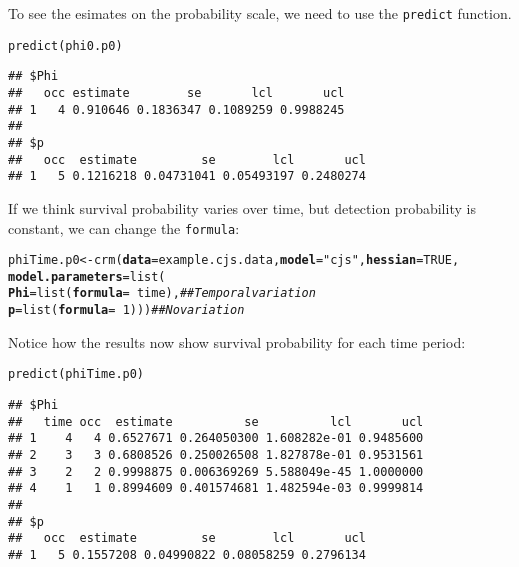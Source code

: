 \documentclass[12pt]{article}\usepackage[]{graphicx}\usepackage[]{color}
\makeatletter
\newcommand{\hlnum}[1]{\textcolor[rgb]{0.69,0.494,0}{#1}}%
\newcommand{\hlstr}[1]{\textcolor[rgb]{0.749,0.012,0.012}{#1}}%
\newcommand{\hlcom}[1]{\textcolor[rgb]{0.514,0.506,0.514}{\textit{#1}}}%
\newcommand{\hlopt}[1]{\textcolor[rgb]{0,0,0}{#1}}%
\newcommand{\hlstd}[1]{\textcolor[rgb]{0,0,0}{#1}}%
\newcommand{\hlkwb}[1]{\textcolor[rgb]{0,0.341,0.682}{#1}}%
\newcommand{\hlkwc}[1]{\textcolor[rgb]{0,0,0}{\textbf{#1}}}%
\newcommand{\hlkwd}[1]{\textcolor[rgb]{0.004,0.004,0.506}{#1}}%
\newenvironment{kframe}{%
 \def\at@end@of@kframe{}%
 \ifinner\ifhmode%
  \def\at@end@of@kframe{\end{minipage}}%
  \begin{minipage}{\columnwidth}%
 \fi\fi%
 \def\FrameCommand##1{\hskip\@totalleftmargin \hskip-\fboxsep
 \colorbox{shadecolor}{##1}\hskip-\fboxsep
     \hskip-\linewidth \hskip-\@totalleftmargin \hskip\columnwidth}%
 \MakeFramed {\advance\hsize-\width
   \@totalleftmargin\z@ \linewidth\hsize
   \@setminipage}}%
 {\par\unskip\endMakeFramed%
 \at@end@of@kframe}
\newenvironment{knitrout}{}{} %
\newcommand{\inr}[1]{\colorbox{inlinecolor}{\texttt{#1}}}
\makeatother
\begin{document}
To see the esimates on the probability scale, we need to use the
\inr{predict} function.

\begin{knitrout}
\color{fgcolor}\begin{kframe}
\begin{alltt}
\hlkwd{predict}\hlstd{(phi0.p0)}
\end{alltt}
\begin{verbatim}
## $Phi
##   occ estimate        se       lcl       ucl
## 1   4 0.910646 0.1836347 0.1089259 0.9988245
## 
## $p
##   occ  estimate         se        lcl       ucl
## 1   5 0.1216218 0.04731041 0.05493197 0.2480274
\end{verbatim}
\end{kframe}
\end{knitrout}


If we think survival probability varies over time, but detection
probability is constant, we can change the \texttt{formula}:


\begin{knitrout}
\color{fgcolor}\begin{kframe}
\begin{alltt}
\hlstd{phiTime.p0} \hlkwb{<-} \hlkwd{crm}\hlstd{(}\hlkwc{data}\hlstd{=example.cjs.data,} \hlkwc{model}\hlstd{=}\hlstr{"cjs"}\hlstd{,} \hlkwc{hessian}\hlstd{=}\hlnum{TRUE}\hlstd{,}
                  \hlkwc{model.parameters}\hlstd{=}\hlkwd{list}\hlstd{(}
                      \hlkwc{Phi}\hlstd{=}\hlkwd{list}\hlstd{(}\hlkwc{formula}\hlstd{=}\hlopt{~}\hlstd{time),}  \hlcom{## Temporal variation}
                      \hlkwc{p}\hlstd{=}\hlkwd{list}\hlstd{(}\hlkwc{formula}\hlstd{=}\hlopt{~}\hlnum{1}\hlstd{)))}      \hlcom{## No variation}
\end{alltt}
\end{kframe}
\end{knitrout}

Notice how the results now show survival probability for each time period:

\begin{knitrout}
\color{fgcolor}\begin{kframe}
\begin{alltt}
\hlkwd{predict}\hlstd{(phiTime.p0)}
\end{alltt}
\begin{verbatim}
## $Phi
##   time occ  estimate          se          lcl       ucl
## 1    4   4 0.6527671 0.264050300 1.608282e-01 0.9485600
## 2    3   3 0.6808526 0.250026508 1.827878e-01 0.9531561
## 3    2   2 0.9998875 0.006369269 5.588049e-45 1.0000000
## 4    1   1 0.8994609 0.401574681 1.482594e-03 0.9999814
## 
## $p
##   occ  estimate         se        lcl       ucl
## 1   5 0.1557208 0.04990822 0.08058259 0.2796134
\end{verbatim}
\end{kframe}
\end{knitrout}
\end{document}
